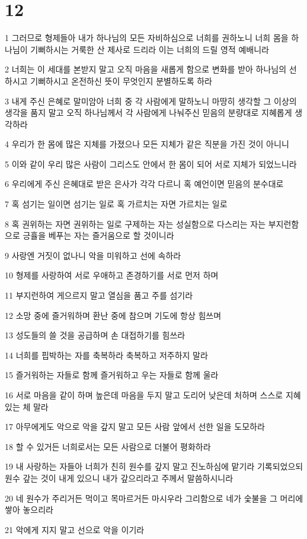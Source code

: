 \chapter{12}

\par 1 그러므로 형제들아 내가 하나님의 모든 자비하심으로 너희를 권하노니 너희 몸을 하나님이 기뻐하시는 거룩한 산 제사로 드리라 이는 너희의 드릴 영적 예배니라
\par 2 너희는 이 세대를 본받지 말고 오직 마음을 새롭게 함으로 변화를 받아 하나님의 선하시고 기뻐하시고 온전하신 뜻이 무엇인지 분별하도록 하라
\par 3 내게 주신 은혜로 말미암아 너희 중 각 사람에게 말하노니 마땅히 생각할 그 이상의 생각을 품지 말고 오직 하나님께서 각 사람에게 나눠주신 믿음의 분량대로 지혜롭게 생각하라
\par 4 우리가 한 몸에 많은 지체를 가졌으나 모든 지체가 같은 직분을 가진 것이 아니니
\par 5 이와 같이 우리 많은 사람이 그리스도 안에서 한 몸이 되어 서로 지체가 되었느니라
\par 6 우리에게 주신 은혜대로 받은 은사가 각각 다르니 혹 예언이면 믿음의 분수대로
\par 7 혹 섬기는 일이면 섬기는 일로 혹 가르치는 자면 가르치는 일로
\par 8 혹 권위하는 자면 권위하는 일로 구제하는 자는 성실함으로 다스리는 자는 부지런함으로 긍휼을 베푸는 자는 즐거움으로 할 것이니라
\par 9 사랑엔 거짓이 없나니 악을 미워하고 선에 속하라
\par 10 형제를 사랑하여 서로 우애하고 존경하기를 서로 먼저 하며
\par 11 부지런하여 게으르지 말고 열심을 품고 주를 섬기라
\par 12 소망 중에 즐거워하며 환난 중에 참으며 기도에 항상 힘쓰며
\par 13 성도들의 쓸 것을 공급하며 손 대접하기를 힘쓰라
\par 14 너희를 핍박하는 자를 축복하라 축복하고 저주하지 말라
\par 15 즐거워하는 자들로 함께 즐거워하고 우는 자들로 함께 울라
\par 16 서로 마음을 같이 하며 높은데 마음을 두지 말고 도리어 낮은데 처하며 스스로 지혜 있는 체 말라
\par 17 아무에게도 악으로 악을 갚지 말고 모든 사람 앞에서 선한 일을 도모하라
\par 18 할 수 있거든 너희로서는 모든 사람으로 더불어 평화하라
\par 19 내 사랑하는 자들아 너희가 친히 원수를 갚지 말고 진노하심에 맡기라 기록되었으되 원수 갚는 것이 내게 있으니 내가 갚으리라고 주께서 말씀하시니라
\par 20 네 원수가 주리거든 먹이고 목마르거든 마시우라 그리함으로 네가 숯불을 그 머리에 쌓아 놓으리라
\par 21 악에게 지지 말고 선으로 악을 이기라

